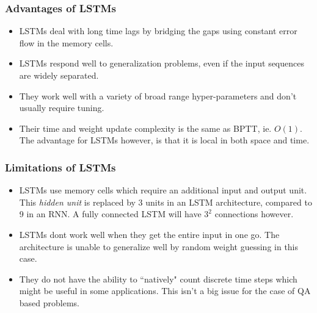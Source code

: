 \documentclass[a4paper,12pt]{report}
\begin{document}
            \subsubsection{Advantages of LSTMs}
                \begin{itemize}
                    \item LSTMs deal with long time lags by bridging the gaps using constant error flow in the memory cells.
                    \item LSTMs respond well to generalization problems, even if the input sequences are widely separated.
                    \item They work well with a variety of broad range hyper-parameters and don't usually require tuning.
                    \item Their time and weight update complexity is the same as BPTT, ie. $ O(1) $. The advantage for LSTMs however, is that it is local in both space and time.
                \end{itemize}

            \subsubsection{Limitations of LSTMs}
                \begin{itemize}
                    \item LSTMs use memory cells which require an additional input and output unit. This \textit{hidden unit} is replaced by 3 units in an LSTM architecture, compared to 9 in an RNN. A fully connected LSTM will have $ 3^{2} $ connections however.
                    \item LSTMs dont work well when they get the entire input in one go. The architecture is unable to generalize well by random weight guessing in this case.
                    \item They do not have the ability to ``natively" count discrete time steps which might be useful in some applications. This isn't a big issue for the case of QA based problems.
                \end{itemize}
\end{document}
